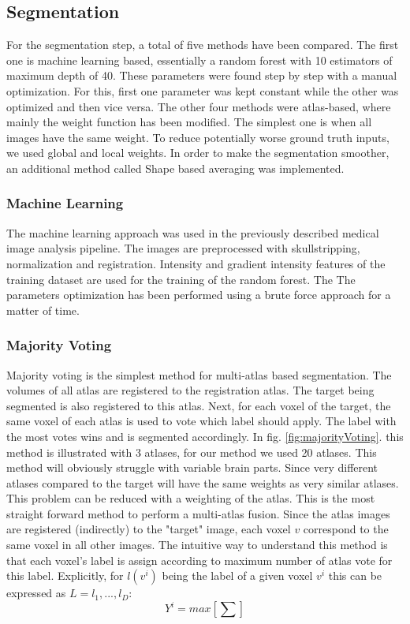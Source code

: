 \subsection*{Segmentation}
For the segmentation step, a total of five methods have been compared. The first one is machine learning based, essentially a random forest with 10 estimators of maximum depth of 40. These parameters were found step by step with a manual optimization. For this, first one parameter was kept constant while the other was optimized and then vice versa. The other four methods were atlas-based, where mainly the weight function has been modified. The simplest one is when all images have the same weight. To reduce potentially worse ground truth inputs, we used global and local weights. In order to make the segmentation smoother, an additional method called Shape based averaging was implemented.

\subsubsection*{Machine Learning}
The machine learning approach was used in the previously described medical image analysis pipeline. The images are preprocessed with skullstripping, normalization and registration. Intensity and gradient intensity features of the training dataset are used for the training of the random forest. The 
The parameters optimization has been performed using a brute force approach for a matter of time.

\subsubsection*{Majority Voting}
Majority voting is the simplest method for multi-atlas based segmentation. The volumes of all atlas are registered to the registration atlas. The target being segmented is also registered to this atlas. Next, for each voxel of the target, the same voxel of each atlas is used to vote which label should apply. The label with the most votes wins and is segmented accordingly. In fig. \ref{fig:majorityVoting}. this method is illustrated with 3 atlases, for our method we used 20 atlases. This method will obviously struggle with variable brain parts. Since very different atlases compared to the target will have the same weights as very similar atlases. This problem can be reduced with a weighting of the atlas.
This is the most straight forward method to perform a multi-atlas fusion. Since the atlas images are registered (indirectly) to the "target" image, each voxel $v$ correspond to the same voxel in all other images. The intuitive way to understand this method is that each voxel's label is assign according to maximum number of atlas vote for this label. Explicitly, for $l(v^{i})$ being the label of a given voxel $v^{i}$ this can be expressed as $L={l_1, ... , l_D}$:
\[ Y^{i}=max[\sum{}] \]


